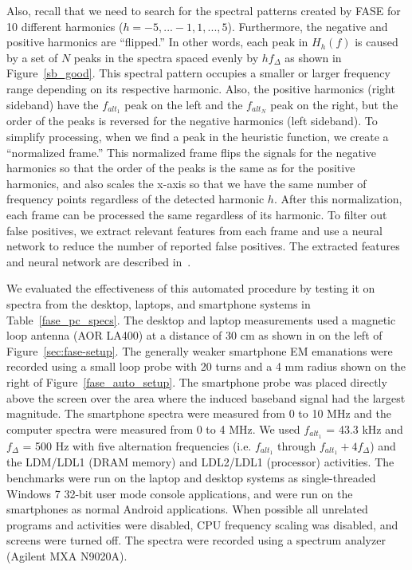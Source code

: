 Also, recall that we need to search for the spectral patterns created by FASE for 10 different harmonics ($h=-5,...-1,1,...,5$). Furthermore, the negative and positive harmonics are ``flipped.'' In other words, each peak in $H_h(f)$ is caused by a set of $N$ peaks in the spectra spaced evenly by $hf_\Delta$ as shown in Figure~\ref{sb_good}. This spectral pattern occupies a smaller or larger frequency range depending on its respective harmonic. Also, the positive harmonics (right sideband) have the $f_{alt_1}$ peak on the left and the $f_{alt_N}$ peak on the right, but the order of the peaks is reversed for the negative harmonics (left sideband). To simplify processing, when we find a peak in the heuristic function, we create a ``normalized frame.'' This normalized frame flips the signals for the negative harmonics so that the order of the peaks is the same as for the positive harmonics, and also scales the x-axis so that we have the same number of frequency points regardless of the detected harmonic $h$. After this normalization, each frame can be processed the same regardless of its harmonic. To filter out false positives, we extract relevant features from each frame and use a neural network to reduce the number of reported false positives. The extracted features and neural network are described in~\cite{wang2016}.

We evaluated the effectiveness of this automated procedure by testing it on spectra from the desktop, laptops, and smartphone systems in Table~\ref{fase_pc_specs}. The desktop and laptop measurements used a magnetic loop antenna (AOR LA400) at a distance of 30 cm as shown in on the left of Figure~\ref{sec:fase-setup}. The generally weaker smartphone EM emanations were recorded using a small loop probe with 20 turns and a 4 mm radius shown on the right of Figure~\ref{fase_auto_setup}. The smartphone probe was placed directly above the screen over the area where the induced baseband signal had the largest magnitude. The smartphone spectra were measured from 0 to 10 MHz and the computer spectra were measured from 0 to 4 MHz. We used $f_{alt_1}$ = 43.3 kHz and $f_\Delta$ = 500 Hz with five alternation frequencies (i.e. $f_{alt_1}$ through $f_{alt_1}+4f_\Delta$) and the LDM/LDL1 (DRAM memory) and LDL2/LDL1 (processor) activities. The benchmarks were run on the laptop and desktop systems as single-threaded Windows 7 32-bit user mode console applications, and were run on the smartphones as normal Android applications. When possible all unrelated programs and activities were disabled, CPU frequency scaling was disabled, and screens were turned off. The spectra were recorded using a spectrum analyzer (Agilent MXA N9020A). 

